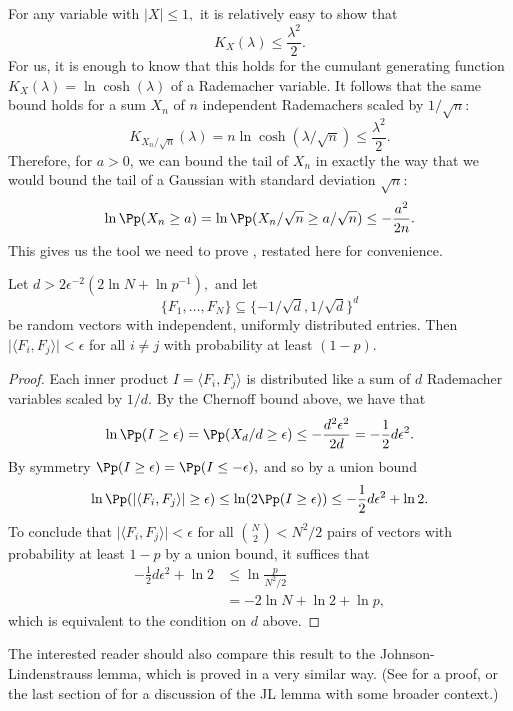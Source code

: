 For any variable with $\lvert X \rvert \le 1,$ it is relatively easy to show that
$$
K_X(\lambda) \le \frac{\lambda^2} 2.
$$
For us, it is enough to know that this holds for the cumulant generating function $K_X(\lambda) = \ln \cosh(\lambda)$ of a Rademacher variable. It follows that the same bound holds for a sum $X_n$ of $n$ independent Rademachers scaled by $1/\sqrt n$:
$$
K_{X_n/\sqrt n}(\lambda) = n \ln \cosh(\lambda / \sqrt n) \le \frac{\lambda^2}{2}.
$$
Therefore, for $a > 0$, we can bound the tail of $X_n$ in exactly the way that we would bound the tail of a Gaussian with standard deviation $\sqrt{n}$:
$$
\ln \Pp(X_n \ge a) = \ln \Pp(X_n / \sqrt{n} \ge a / \sqrt n) \le - \frac{a^2}{2n}.
$$
This gives us the tool we need to prove , restated here for convenience.

\begin{proposition*}
	Let $d > 2 \epsilon^{-2} (2 \ln N + \ln p^{-1}),$ and let
	$$
		\{ F_1, \dots, F_N \} \subseteq \{ - 1/\sqrt d,  1 / \sqrt d \}^d
	$$
	be random vectors with independent, uniformly distributed entries. Then $\lvert \langle F_i, F_j \rangle \rvert < \epsilon$ for all $i \neq j$ with probability at least $(1 - p).$
\end{proposition*}

\begin{proof}
    Each inner product $I = \langle F_i, F_j \rangle$ is distributed like a sum of $d$ Rademacher variables scaled by $1/d.$ By the Chernoff bound above, we have that
    $$
    \ln \Pp(I \ge \epsilon) = \Pp(X_d / d \ge \epsilon) \le - \frac{d^2 \epsilon^2}{2d} = - \frac 1 2 d \epsilon^2.
    $$
    By symmetry $\Pp(I \ge \epsilon) = \Pp(I \le -\epsilon),$ and so by a union bound
    $$
    \ln \Pp(\lvert \langle F_i, F_j \rangle \vert \ge \epsilon) \le \ln (2 \Pp(I \ge \epsilon)) \le - \frac 1 2 d \epsilon^2 + \ln 2.
    $$
    To conclude that $\lvert \langle F_i, F_j \rangle \vert < \epsilon$ for all $\binom N 2 < N^2/2$ pairs of vectors with probability at least $1 - p$ by a union bound, it suffices that
    \begin{align*}
    - \frac 1 2 d \epsilon^2 + \ln 2 & \le \ln \frac{p}{N^2/2}\\
    & = -2 \ln N + \ln 2 + \ln p,
    \end{align*}
    which is equivalent to the condition on $d$ above.
\end{proof}

The interested reader should also compare this result to the Johnson-Lindenstrauss lemma, which is proved in a very similar way. (See \cite{dasgupta_elementary_2003} for a proof, or the last section of \cite{foucart_sparse_2013} for a discussion of the JL lemma with some broader context.)
